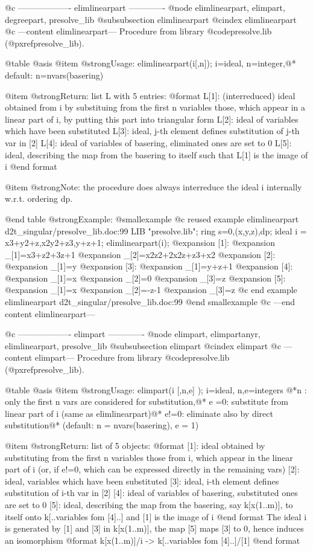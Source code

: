 @c ------------------- elimlinearpart -------------
@node elimlinearpart, elimpart, degreepart, presolve_lib
@subsubsection elimlinearpart
@cindex elimlinearpart
@c ---content elimlinearpart---
Procedure from library @code{presolve.lib} (@pxref{presolve_lib}).

@table @asis
@item @strong{Usage:}
elimlinearpart(i[,n]); i=ideal, n=integer,@*
default: n=nvars(basering)

@item @strong{Return:}
list L with 5 entries:
  @format
  L[1]: (interreduced) ideal obtained from i by substituing
        from the first n variables those, which appear in a linear part
        of i, by putting this part into triangular form
  L[2]: ideal of variables which have been substituted
  L[3]: ideal, j-th element defines substitution of j-th var in [2]
  L[4]: ideal of variables of basering, eliminated ones are set to 0
  L[5]: ideal, describing the map from the basering to itself such that
        L[1] is the image of i
  @end format

@item @strong{Note:}
the procedure does always interreduce the ideal i internally w.r.t.
ordering dp.

@end table
@strong{Example:}
@smallexample
@c reused example elimlinearpart d2t_singular/presolve_lib.doc:99 
LIB "presolve.lib";
ring s=0,(x,y,z),dp;
ideal i = x3+y2+z,x2y2+z3,y+z+1;
elimlinearpart(i);
@expansion{} [1]:
@expansion{}    _[1]=x3+z2+3z+1
@expansion{}    _[2]=x2z2+2x2z+z3+x2
@expansion{} [2]:
@expansion{}    _[1]=y
@expansion{} [3]:
@expansion{}    _[1]=y+z+1
@expansion{} [4]:
@expansion{}    _[1]=x
@expansion{}    _[2]=0
@expansion{}    _[3]=z
@expansion{} [5]:
@expansion{}    _[1]=x
@expansion{}    _[2]=-z-1
@expansion{}    _[3]=z
@c end example elimlinearpart d2t_singular/presolve_lib.doc:99
@end smallexample
@c ---end content elimlinearpart---

@c ------------------- elimpart -------------
@node elimpart, elimpartanyr, elimlinearpart, presolve_lib
@subsubsection elimpart
@cindex elimpart
@c ---content elimpart---
Procedure from library @code{presolve.lib} (@pxref{presolve_lib}).

@table @asis
@item @strong{Usage:}
elimpart(i [,n,e] ); i=ideal, n,e=integers
@*n : only the first n vars are considered for substitution,@*
e =0: substitute from linear part of i (same as elimlinearpart)@*
e!=0: eliminate also by direct substitution@*
(default: n = nvars(basering), e = 1)

@item @strong{Return:}
list of 5 objects:
  @format
  [1]: ideal obtained by substituting from the first n variables those
       from i, which appear in the linear part of i (or, if e!=0, which
       can be expressed directly in the remaining vars)
  [2]: ideal, variables which have been substituted
  [3]: ideal, i-th element defines substitution of i-th var in [2]
  [4]: ideal of variables of basering, substituted ones are set to 0
  [5]: ideal, describing the map from the basering, say k[x(1..m)], to
       itself onto k[..variables fom [4]..] and [1] is the image of i
  @end format
The ideal i is generated by [1] and [3] in k[x(1..m)], the map [5]
maps [3] to 0, hence induces an isomorphism
  @format
            k[x(1..m)]/i -> k[..variables fom [4]..]/[1]
  @end format


